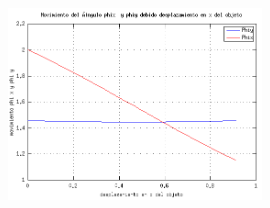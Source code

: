 \documentclass[paper=a4, fontsize=11pt]{scrartcl} %
\numberwithin{equation}{section} %
\numberwithin{figure}{section} %
\numberwithin{table}{section} %
\begin{document}
  \begin{figure}[htbp]
  	\centering
  	\includegraphics[width=0.6\textwidth]{figure1}
  	\caption{}\label{fig: figura}
  \end{figure}
\end{document}
